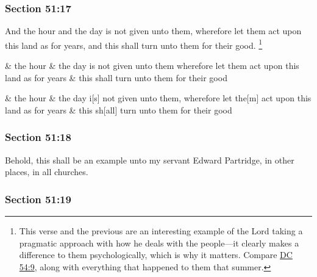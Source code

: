 	\subsubsection{Section 51:17} %
		\label{DC51-17}

		And the hour and the day is not given unto them, wherefore let them act upon this land as for years, and this shall turn unto them for their good.%
			\footnote{%
				This verse and the previous are an interesting example of the Lord taking a pragmatic approach with how he deals with the people---it clearly makes a difference to them psychologically, which is why it matters. Compare \hyperref[DC54-9]{DC 54:9}, along with everything that happened to them that summer.
				}

		\begin{framed}
		\scriptsize
			\begin{compactdesc}
				\item[JSP] \& the hour \& the day is not given unto them wherefore let them act upon this land as for years \& this shall turn unto them for their good
				\item[Gilbert] \& the hour \& the day i[s] not given unto them, wherefore let the[m] act upon this land as for years \& this sh[all] turn unto them for their good
			\end{compactdesc}
		\end{framed}

	\subsubsection{Section 51:18} %
		\label{DC51-18}

		Behold, this shall be an example unto my servant Edward Partridge, in other places, in all churches.


	\subsubsection{Section 51:19} %
		\label{DC51-19}

